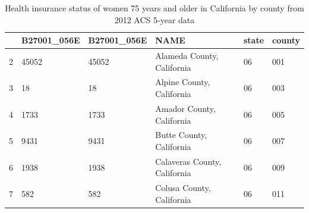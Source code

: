 \documentclass{article}\usepackage[]{graphicx}\usepackage[]{color}
\begin{document}
\begin{table}[ht]
\centering
\begin{tabular}{rlllll}
  \hline
 & B27001\_056E & B27001\_056E & NAME & state & county \\ 
  \hline
2 & 45052 & 45052 & Alameda County, California & 06 & 001 \\ 
  3 & 18 & 18 & Alpine County, California & 06 & 003 \\ 
  4 & 1733 & 1733 & Amador County, California & 06 & 005 \\ 
  5 & 9431 & 9431 & Butte County, California & 06 & 007 \\ 
  6 & 1938 & 1938 & Calaveras County, California & 06 & 009 \\ 
  7 & 582 & 582 & Colusa County, California & 06 & 011 \\ 
   \hline
\end{tabular}
\caption{Health insurance status of women 75 years and older in California by county from 2012 ACS 5-year data} 
\label{tab:df}
\end{table}
\end{document}

